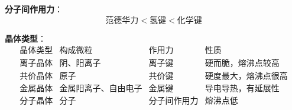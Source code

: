 \textbf{分子间作用力}：
\[
\text{范德华力} < \text{氢键} < \text{化学键}
\]

\textbf{晶体类型}：
\[
\begin{array}{c|c|c|c}
\text{晶体类型} & \text{构成微粒} & \text{作用力} & \text{性质} \\ \hline
\text{离子晶体} & \text{阴、阳离子} & \text{离子键} & \text{硬而脆，熔沸点较高} \\
\text{共价晶体} & \text{原子} & \text{共价键} & \text{硬度最大，熔沸点很高} \\
\text{金属晶体} & \text{金属阳离子、自由电子} & \text{金属键} & \text{导电导热，有延展性} \\
\text{分子晶体} & \text{分子} & \text{分子间作用力} & \text{熔沸点低} \\
\end{array}
\]
